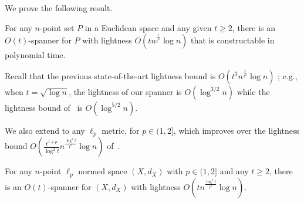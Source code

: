 We prove the following result. 

\begin{theorem}\label{thm:Euclidean-high} For any $n$-point set $P$ in a Euclidean space and any given $t \ge 2$, there is an $O(t)$-spanner for $P$ with lightness %
	$O(tn^{\frac{1}{t^2}}\log n)$ that is constructable in polynomial time.
\end{theorem}

Recall that the previous state-of-the-art lightness bound is  $O(t^3 n^{\frac{1}{t^2}}\log n)$ \cite{FN18};
e.g., when $t = \sqrt{\log n}$, the lightness of our spanner is $O(\log^{3/2} n)$ while the lightness bound of~\cite{FN18} is $O(\log^{5/2} n)$. 

We also extend  to any $\ell_p$ metric, for $p \in (1,2]$,
which improves over the lightness bound $O(\frac{t^{1+p}}{\log^2 t}n^{\frac{\log^2 t}{t^p}}\log n)$ of~\cite{FN18}. 


\begin{theorem}\label{thm:Lp-high} For any $n$-point $\ell_p$ normed space $(X,d_X)$ with $p \in (1,2]$ and any $t \ge 2$, there is an $O(t)$-spanner for $(X,d_X)$ with lightness $O(t n^{\frac{\log^2 t}{t^p}}\log n)$.
\end{theorem}

